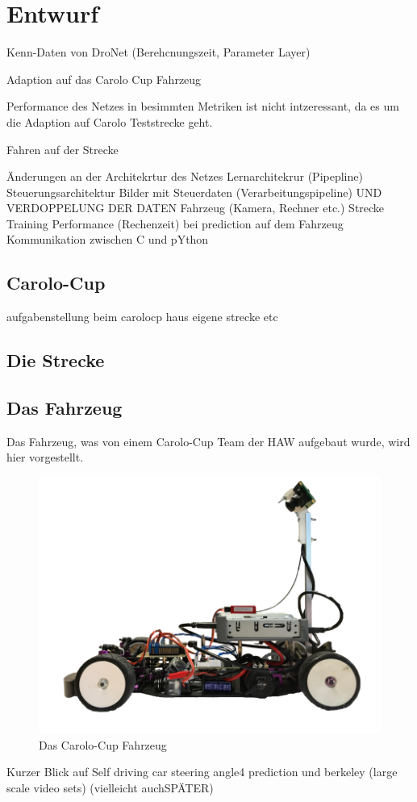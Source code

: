 %
\chapter{Entwurf}



Kenn-Daten von DroNet (Berehcnungszeit, Parameter Layer)


Adaption auf das Carolo Cup Fahrzeug

Performance des Netzes in besimmten Metriken ist nicht intzeressant, da es um die Adaption auf Carolo Teststrecke geht.

Fahren auf der Strecke 


Änderungen an der Architekrtur des Netzes
Lernarchitekrur (Pipepline)
Steuerungsarchitektur
Bilder mit Steuerdaten (Verarbeitungspipeline) UND VERDOPPELUNG DER DATEN
Fahrzeug (Kamera, Rechner etc.)
Strecke 
Training 
Performance (Rechenzeit) bei prediction auf dem Fahrzeug
Kommunikation zwischen C und pYthon


\section{Carolo-Cup}
aufgabenstellung beim carolocp
haus eigene strecke etc

\section{Die Strecke}

\section{Das Fahrzeug}
Das Fahrzeug, was von einem Carolo-Cup Team der HAW aufgebaut wurde, wird hier vorgestellt.


\begin{figure}
	\centering
	\includegraphics[scale=0.3]{figures/Fahrzeug.png}
	\caption{Das Carolo-Cup Fahrzeug}
	\label{img:Carolo-Fahrzeug}
\end{figure}




Kurzer Blick auf  Self driving car steering angle4 prediction und berkeley (large scale video sets) (vielleicht auchSPÄTER)

